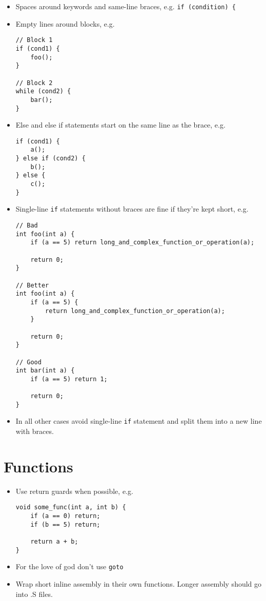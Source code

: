 \documentclass{article}
\begin{document}
\begin{itemize}
	\item Spaces around keywords and same-line braces, e.g. \lstinline{if (condition) { }
	\item Empty lines around blocks, e.g.
	\begin{lstlisting}
// Block 1
if (cond1) {
	foo();
}

// Block 2
while (cond2) {
	bar();
}
	\end{lstlisting}

	\item Else and else if statements start on the same line as the brace, e.g.
	\begin{lstlisting}
if (cond1) {
	a();
} else if (cond2) {
	b();
} else {
	c();
}
	\end{lstlisting}

	\item Single-line \lstinline{if} statements without braces are fine if they're kept short, e.g.
	
	\begin{lstlisting}
// Bad
int foo(int a) {
	if (a == 5) return long_and_complex_function_or_operation(a);

	return 0;
}

// Better
int foo(int a) {
	if (a == 5) {
		return long_and_complex_function_or_operation(a);
	}

	return 0;
}

// Good
int bar(int a) {
	if (a == 5) return 1;

	return 0;
}
	\end{lstlisting}

	\item In all other cases avoid single-line \lstinline{if} statement and split them into a new line with braces.
\end{itemize}

\section{Functions}
\begin{itemize}
	\item Use return guards when possible, e.g.
	\begin{lstlisting}
void some_func(int a, int b) {
	if (a == 0) return;
	if (b == 5) return;

	return a + b;
}
	\end{lstlisting}

	\item For the love of god don't use \lstinline{goto}
	\item Wrap short inline assembly in their own functions. Longer assembly should go into .S files.
\end{itemize}
\end{document}
